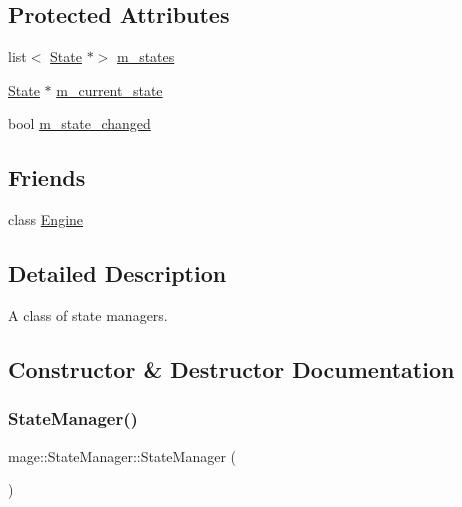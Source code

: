 \subsection*{Protected Attributes}
\begin{DoxyCompactItemize}
\item 
list$<$ \hyperlink{classmage_1_1_state}{State} $\ast$$>$ \hyperlink{classmage_1_1_state_manager_a2181432805f365bfb8ccff0f959d2121}{m\+\_\+states}
\item 
\hyperlink{classmage_1_1_state}{State} $\ast$ \hyperlink{classmage_1_1_state_manager_a737122d580b709e0d122db4a6e1d9006}{m\+\_\+current\+\_\+state}
\item 
bool \hyperlink{classmage_1_1_state_manager_a8e905ec2358a18a5b56d44cf79799afa}{m\+\_\+state\+\_\+changed}
\end{DoxyCompactItemize}
\subsection*{Friends}
\begin{DoxyCompactItemize}
\item 
class \hyperlink{classmage_1_1_state_manager_a3e1914489e4bed4f9f23cdeab34a43dc}{Engine}
\end{DoxyCompactItemize}


\subsection{Detailed Description}
A class of state managers. 

\subsection{Constructor \& Destructor Documentation}
\hypertarget{classmage_1_1_state_manager_a6c4504d0b50fe671299b080f3be30c8e}{}\label{classmage_1_1_state_manager_a6c4504d0b50fe671299b080f3be30c8e} 
\subsubsection{\texorpdfstring{State\+Manager()}{StateManager()}}
{\footnotesize\ttfamily mage\+::\+State\+Manager\+::\+State\+Manager (\begin{DoxyParamCaption}{ }\end{DoxyParamCaption})\hspace{0.3cm}{\ttfamily [protected]}}

